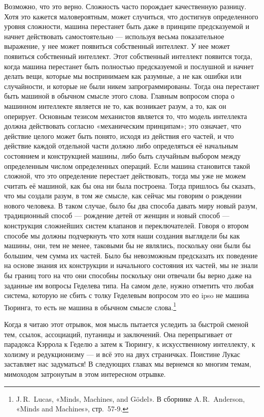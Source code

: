 \documentclass[../main.tex]{subfiles}
\begin{document}
Возможно, что это верно. Сложность часто порождает качественную разницу. Хотя это кажется маловероятным, может случиться, что достигнув определенного уровня сложности, машина перестанет быть даже в принципе предсказуемой и начнет действовать самостоятельно --- используя весьма показательное выражение, у нее может появиться собственный интеллект. У нее может появиться собственный интеллект. Этот собственный интеллект появится тогда, когда машина перестанет быть полностью предсказуемой и послушной и начнет делать вещи, которые мы воспринимаем как разумные, а не как ошибки или случайности, и которые не были никем запрограммированы. Тогда она перестанет быть машиной в обычном смысле этого слова. Главным вопросом спора о машинном интеллекте является не то, как возникает разум, а то, как он оперирует. Основным тезисом механистов является то, что модель интеллекта должна действовать согласно «механическим принципам»; это означает, что действие целого может быть понято, исходя из действия его частей, и что действие каждой отдельной части должно либо определяться её начальным состоянием и конструкцией машины, либо быть случайным выбором между определенным числом определенных операций. Если машина становится такой сложной, что это определение перестает действовать, тогда мы уже не можем считать её машиной, как бы она ни была построена. Тогда пришлось бы сказать, что мы создали разум, в том же смысле, как сейчас мы говорим о рождении нового человека. В таком случае, было бы два способа давать миру новый разум, традиционный способ --- рождение детей от женщин и новый способ --- конструкция сложнейших систем клапанов и переключателей. Говоря о втором способе мы должны подчеркнуть что хотя наши создания выглядели бы как машины, они, тем не менее, таковыми бы не являлись, поскольку они были бы большим, чем сумма их частей. Было бы невозможным предсказать их поведение на основе знания их конструкции и начального состояния их частей, мы не знали бы границ того на что они способны поскольку они отвечали бы верно даже на заданные им вопросы Геделева типа. На самом деле, нужно отметить что любая система, которую не сбить с толку Геделевым вопросом это ео ipso не машина Тюринга, то есть не машина в обычном смысле слова.\footnote{J.\,R.~Lucas, «Minds, Machines, and Gödel». В сборнике A.\,R.~Anderson, «Minds and Machines», стр.~57-9.}

Когда я читаю этот отрывок, моя мысль пытается уследить за быстрой сменой тем, ссылок, ассоциаций, путаницы и заключений. Она перепрыгивает от парадокса Кэррола к Геделю а затем к Тюрингу, к искусственному интеллекту, к холизму и редукционизму --- и всё это на двух страничках. Поистине Лукас заставляет нас задуматься! В следующих главах мы вернемся ко многим темам, мимоходом затронутым в этом интересном отрывке.
\end{document}
